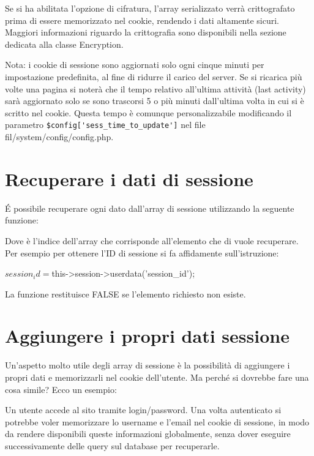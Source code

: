Se si ha abilitata l'opzione di cifratura, l'array serializzato verrà crittografato prima di essere memorizzato nel cookie, rendendo i dati altamente sicuri. Maggiori informazioni riguardo la crittografia sono disponibili nella sezione dedicata alla classe Encryption.

Nota: i cookie di sessione sono aggiornati solo ogni cinque minuti per impostazione predefinita, al fine di ridurre il carico del server. Se si ricarica più volte una pagina si noterà che il tempo relativo all'ultima attività (last activity) sarà aggiornato solo se sono trascorsi 5 o più minuti dall'ultima volta in cui si è scritto nel cookie. Questa tempo è comunque personalizzabile modificando il parametro \verb|$config['sess_time_to_update']| nel file fil{/system/config/config.php}.

\section*{Recuperare i dati di sessione}

\'E possibile recuperare ogni dato dall'array di sessione utilizzando la seguente funzione:


Dove  è l'indice dell'array che corrisponde all'elemento che di vuole recuperare. Per esempio per ottenere l'ID di sessione si fa affidamente sull'istruzione:

\begin{code}
$session_id = $this->session->userdata('session_id');
\end{code}

La funzione restituisce FALSE se l'elemento richiesto non esiste.

\section*{Aggiungere i propri dati sessione}

Un'aspetto molto utile degli array di sessione è la possibilità di aggiungere i propri dati e memorizzarli nel cookie dell'utente. Ma perché si dovrebbe fare una cosa simile? Ecco un esempio:

Un utente accede al sito tramite login/password. Una volta autenticato si potrebbe voler memorizzare lo username e l'email nel cookie di sessione, in modo da rendere disponibili queste informazioni globalmente, senza dover eseguire successivamente delle query sul database per recuperarle. 

